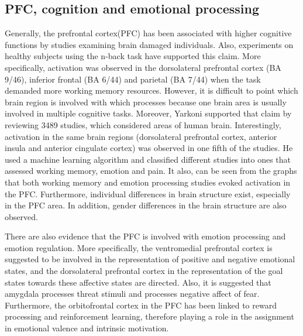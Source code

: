 \documentclass[a4paper]{report}
\begin{document}
		\subsection{PFC, cognition and emotional processing}
		Generally, the prefrontal cortex(PFC) has been associated with higher cognitive functions by studies examining brain damaged individuals\cite{shallice1988neuropsychology,smith1997working}. Also, experiments on healthy subjects using the n-back task\cite{braver1997parametric} have supported this claim. More specifically, activation was observed in the dorsolateral prefrontal cortex (BA 9/46), inferior frontal (BA 6/44) and parietal (BA 7/44) when the task demanded more working memory resources. However, it is difficult to point which brain region is involved with which processes because one brain area is usually involved in multiple cognitive tasks\cite{brown2012common}. Moreover, Yarkoni\cite{yarkoni2011large} supported that claim by reviewing 3489 studies, which considered areas of human brain. Interestingly, activation in the same brain regions (dorsolateral prefrontal cortex, anterior insula and anterior cingulate cortex) was observed in one fifth of the studies. He used a machine learning algorithm and classified different studies into ones that assessed working memory, emotion and pain. It also, can be seen from the graphs that both working memory and emotion processing studies evoked activation in the PFC. Furthermore, individual differences in brain structure exist, especially in the PFC area\cite{thompson2001genetic}. In addition, gender differences in the brain structure are also observed\cite{cosgrove2007evolving}. 
		
		There are also evidence that the PFC is involved with emotion processing and emotion regulation\cite{davidson2002anxiety,damasio1996somatic,balconi2012detection}. More specifically, the ventromedial prefrontal cortex is suggested to be involved in the representation of positive and negative emotional states, and the dorsolateral prefrontal cortex in the representation of the goal states towards these affective states are directed. Also, it is suggested that amygdala processes threat stimuli and processes negative affect of fear\cite{davidson2002anxiety}. Furthermore, the orbitofrontal cortex in the PFC has been linked to reward processing and reinforcement learning\cite{rolls2000orbitofrontal}, therefore playing a role in the assignment in emotional valence and intrinsic motivation.
		
\end{document}
